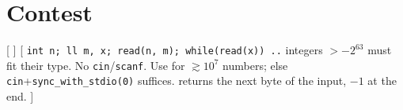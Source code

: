 \section{Contest}
\twolevels
{}

[
]\label{template}
\label{command}
[
	 \texttt{int n; ll m, x; read(n, m); while(read(x)) ..}
	 integers $> -2^{63}$ must fit their type. No \texttt{cin}/\texttt{scanf}. Use for $\gtrsim 10^7$ numbers; else \texttt{cin}+\texttt{sync\_with\_stdio(0)} suffices.
	 returns the next byte of the input, $-1$ at the end.
]\label{fastio}

